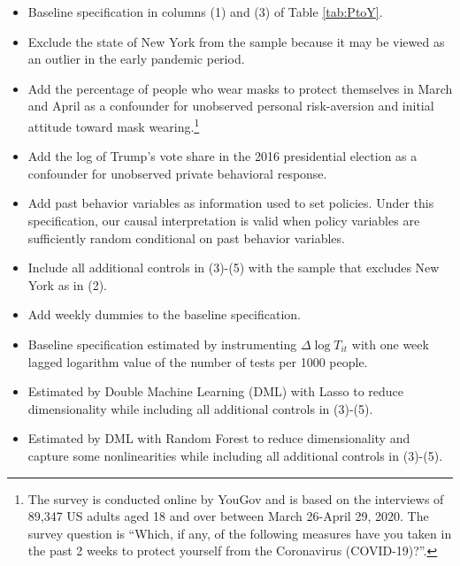 \documentclass[3p, longtitle]{elsarticle}
\theoremstyle{definition}
\begin{document}
  \begin{itemize}
  \item[(1)] Baseline specification  in columns (1) and (3) of Table  \ref{tab:PtoY}.
  \item[(2)]  Exclude  the state of New York from the sample because it may be viewed as an outlier in the early pandemic period.
  \item[(3)]   Add  the percentage of people who wear masks to protect themselves in March and April as a confounder for unobserved  personal risk-aversion and initial attitude toward mask wearing.\footnote{ The survey is conducted online by YouGov and is based on the interviews of 89,347 US adults aged 18 and over between March 26-April 29, 2020.  The survey question is ``Which, if any, of the following measures have you taken in the past 2 weeks to protect yourself from the Coronavirus (COVID-19)?''.}
   \item[(4)]   Add the log of Trump's vote share  in the 2016 presidential election as a confounder for unobserved private behavioral response.
   \item[(5)]   Add  past behavior variables  as information used to set policies. Under this specification, our causal interpretation is valid when policy variables are sufficiently random conditional on past behavior variables.
   \item[(6)]   Include all additional controls in (3)-(5) with the sample that excludes New York as in (2).
   \item[(7)] Add weekly dummies  to the baseline specification.
   \item[(8)] Baseline specification estimated by instrumenting $\Delta \log T_{it}$ with one week lagged  logarithm  value of the number of tests per 1000 people.
   \item[(9)]   Estimated by Double Machine Learning (DML) \citep[e.g.,][]{chernozhukov18} with Lasso to reduce dimensionality while including all additional controls in (3)-(5).     \item[(10)]  Estimated by DML with Random Forest to reduce dimensionality  and capture some nonlinearities while including all additional controls in (3)-(5).   %
  \end{itemize}
\end{document}

